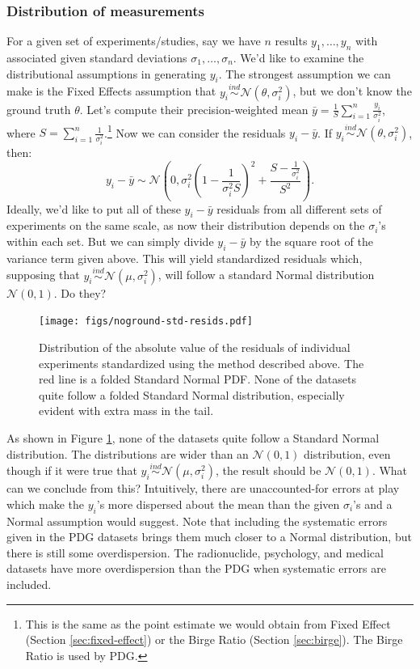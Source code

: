 \documentclass[12pt]{article}
\begin{document}
\subsubsection{Distribution of measurements}\label{distribution-of-measurements}

For a given set of experiments/studies, say we have $n$ results $y_1,\ldots,y_n$ with associated given standard deviations $\sigma_1,\ldots,\sigma_n$. We'd like to examine the distributional assumptions in generating $y_i$. The strongest assumption we can make is the Fixed Effects assumption that $y_i\overset{ind}{\sim}\mathcal{N}(\theta,\sigma_i^2)$, but we don't know the ground truth $\theta$. Let's compute their precision-weighted mean $\bar{y}=\frac{1}{S}\sum_{i=1}^n\frac{y_i}{\sigma_i^2}$, where $S=\sum_{i=1}^n \frac{1}{\sigma_i^2}$.\footnote{This is the same as the point estimate we would obtain from Fixed Effect (Section \ref{sec:fixed-effect}) or the Birge Ratio (Section \ref{sec:birge}). The Birge Ratio is used by PDG.} Now we can consider the residuals $y_i-\bar{y}$. If $y_i\overset{ind}{\sim}\mathcal{N}(\theta,\sigma_i^2)$, then:
\[y_i-\bar{y}\sim \mathcal{N}\left(0, \sigma_i^2\left(1-\frac{1}{\sigma_i^2S}\right)^2+\frac{S-\frac{1}{\sigma_i^2}}{S^2}\right).\]
Ideally, we'd like to put all of these $y_i-\bar{y}$ residuals from all different sets of experiments on the same scale, as now their distribution depends on the $\sigma_i$'s within each set. But we can simply divide $y_i-\bar{y}$ by the square root of the variance term given above. This will yield standardized residuals which, supposing that $y_i\overset{ind}{\sim} \mathcal{N}(\mu,\sigma_i^2)$, will follow a standard Normal distribution $\mathcal{N}(0,1)$. Do they?

\begin{figure}[H]
\centering
\texttt{[image: figs/noground-std-resids.pdf]}
\caption{Distribution of the absolute value of the residuals of individual experiments standardized using the method described above. The red line is a folded Standard Normal PDF. None of the datasets quite follow a folded Standard Normal distribution, especially evident with extra mass in the tail.}
\label{fig:noground-std-resids}
\end{figure}

As shown in Figure \ref{fig:noground-std-resids}, none of the datasets quite follow a Standard Normal distribution. The distributions are wider than an $\mathcal{N}(0,1)$ distribution, even though if it were true that $y_i\overset{ind}{\sim} \mathcal{N}(\mu,\sigma_i^2)$, the result should be $\mathcal{N}(0,1)$. What can we conclude from this? Intuitively, there are unaccounted-for errors at play which make the $y_i$'s more dispersed about the mean than the given $\sigma_i$'s and a Normal assumption would suggest. Note that including the systematic errors given in the PDG datasets brings them much closer to a Normal distribution, but there is still some overdispersion. The radionuclide, psychology, and medical datasets have more overdispersion than the PDG when systematic errors are included.
\end{document}
